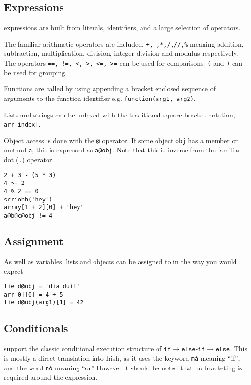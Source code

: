 \subsection{Expressions}
\Setanta{} expressions are built from \hyperref[setantaliterals]{literals}, identifiers, and a large selection of operators.

The familiar arithmetic operators are included, \verb|+,-,*,/,//,%| meaning addition, subtraction, multiplication, division, integer division and modulus respectively. The operators \verb|==, !=, <, >, <=, >=| can be used for comparisons. \verb|(| and \verb|)| can be used for grouping.

Functions are called by using appending a bracket enclosed sequence of arguments to the function identifier e.g. \verb|function(arg1, arg2)|.

Lists and strings can be indexed with the traditional square bracket notation, \verb|arr[index]|.

Object access is done with the \verb|@| operator. If some object \verb|obj| has a member or method \verb|a|, this is expressed as \verb|a@obj|. Note that this is inverse from the familiar dot (\verb|.|) operator.

    \begin{lstlisting}[language=setanta, frame=single, caption=Setanta expressions]
2 + 3 - (5 * 3)
4 >= 2
4 % 2 == 0
scríobh('hey')
array[1 + 2][0] + 'hey'
a@b@c@obj != 4
    \end{lstlisting}

\subsection{Assignment}

As well as variables, lists and objects can be assigned to in the way you would expect
\begin{lstlisting}[language=setanta, frame=single, caption=Valid Setanta assignments]
field@obj = 'dia duit'
arr[0][0] = 4 + 5
field@obj(arg1)[1] = 42
\end{lstlisting}

\subsection{Conditionals}

        \Setanta{} support the classic conditional execution structure of
        $\texttt{if} \rightarrow \texttt{else-if} \rightarrow \texttt{else}$.
        This is mostly a direct translation into Irish, as it uses the keyword \lstinline[language=setanta]|má| meaning ``if'', and the word \lstinline[language=setanta]|nó| meaning ``or'' However it should be noted that no bracketing is required around the expression.

